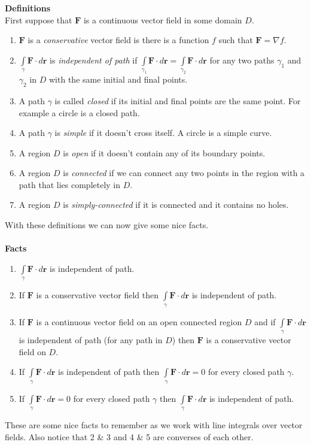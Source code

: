 \documentclass[10pt,reqno]{book}
\theoremstyle{definition}
\renewcommand{\vec}[1]{\mathbf{#1}}
\begin{document}
	\textbf{Definitions}\\
	First suppose that $ \vec{F} $ is a continuous vector field in some domain $ D $.
	\begin{enumerate}
	 	\item $ \vec{F} $ is a \textit{conservative} vector field is there is a function $ f $ such that $ \vec{F} = \nabla f $. 
	 	\item $ \displaystyle{\int\limits_{\gamma} \vec{F} \cdot d\vec{r}} $ is \textit{independent of path} if $ \displaystyle{\displaystyle{\int\limits_{\gamma_1} \vec{F} \cdot d\vec{r}} = \displaystyle{\int\limits_{\gamma_2} \vec{F} \cdot d\vec{r}}} $ for any two paths $ \gamma_1 $ and $ \gamma_2 $ in $ D $ with the same initial and final points.
	 	\item A path $ \gamma $ is called \textit{closed} if its initial and final points are the same point. For example a circle is a closed path.
	 	\item A path $ \gamma $ is \textit{simple} if it doesn't cross itself. A circle is a simple curve.
	 	\item A region $ D $ is \textit{open} if it doesn't contain any of its boundary points.
	 	\item A region $ D $ is \textit{connected} if we can connect any two points in the region with a path that lies completely in $ D $.
	 	\item A region $ D $ is \textit{simply-connected} if it is connected and it contains no holes.
	\end{enumerate}
 	With these definitions we can now give some nice facts. \\ \\
 	\textbf{Facts}
 	\begin{enumerate}
 		\item $ \displaystyle{\int\limits_{\gamma} \vec{F} \cdot d\vec{r}} $ is independent of path.
 		\item If $ \vec{F} $ is a conservative vector field then $ \displaystyle{\int\limits_{\gamma} \vec{F} \cdot d\vec{r}} $ is independent of path.
 		\item If $ \vec{F} $ is a continuous vector field on an open connected region $ D $ and if $ \displaystyle{\int\limits_{\gamma} \vec{F} \cdot d\vec{r}} $ is independent of path (for any path in $ D $) then $ \vec{F} $ is a conservative vector field on $ D $.
 		\item If $ \displaystyle{\int\limits_{\gamma} \vec{F} \cdot d\vec{r}} $ is independent of path then $ \displaystyle{\int\limits_{\gamma} \vec{F} \cdot d\vec{r}} = 0 $ for every closed path $ \gamma $.
 		\item If $ \displaystyle{\int\limits_{\gamma} \vec{F} \cdot d\vec{r}} = 0 $ for every closed path $ \gamma $ then $ \displaystyle{\int\limits_{\gamma} \vec{F} \cdot d\vec{r}} $ is independent of path.
 	\end{enumerate}
 	These are some nice facts to remember as we work with line integrals over vector fields. Also notice that 2 \& 3 and 4 \& 5 are converses of each other.
 	
\end{document}
